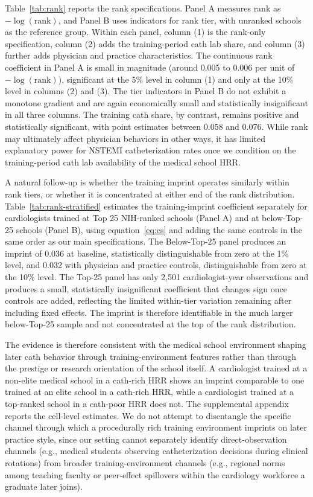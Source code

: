 \documentclass[12pt]{article}
\begin{document}
Table~\ref{tab:rank} reports the rank specifications. Panel A measures rank as $-\log(\text{rank})$, and Panel B uses indicators for rank tier, with unranked schools as the reference group. Within each panel, column (1) is the rank-only specification, column (2) adds the training-period cath lab share, and column (3) further adds physician and practice characteristics. The continuous rank coefficient in Panel A is small in magnitude (around 0.005 to 0.006 per unit of $-\log(\text{rank})$), significant at the 5\% level in column (1) and only at the 10\% level in columns (2) and (3). The tier indicators in Panel B do not exhibit a monotone gradient and are again economically small and statistically insignificant in all three columns. The training cath share, by contrast, remains positive and statistically significant, with point estimates between 0.058 and 0.076. While rank may ultimately affect physician behaviors in other ways, it has limited explanatory power for NSTEMI catheterization rates once we condition on the training-period cath lab availability of the medical school HRR.

A natural follow-up is whether the training imprint operates similarly within rank tiers, or whether it is concentrated at either end of the rank distribution. Table~\ref{tab:rank-stratified} estimates the training-imprint coefficient separately for cardiologists trained at Top 25 NIH-ranked schools (Panel A) and at below-Top-25 schools (Panel B), using equation~\eqref{eq:cs} and adding the same controls in the same order as our main specifications. The Below-Top-25 panel produces an imprint of 0.036 at baseline, statistically distinguishable from zero at the 1\% level, and 0.032 with physician and practice controls, distinguishable from zero at the 10\% level. The Top-25 panel has only 2,501 cardiologist-year observations and produces a small, statistically insignificant coefficient that changes sign once controls are added, reflecting the limited within-tier variation remaining after including fixed effects. The imprint is therefore identifiable in the much larger below-Top-25 sample and not concentrated at the top of the rank distribution.

The evidence is therefore consistent with the medical school environment shaping later cath behavior through training-environment features rather than through the prestige or research orientation of the school itself. A cardiologist trained at a non-elite medical school in a cath-rich HRR shows an imprint comparable to one trained at an elite school in a cath-rich HRR, while a cardiologist trained at a top-ranked school in a cath-poor HRR does not. The supplemental appendix reports the cell-level estimates. We do not attempt to disentangle the specific channel through which a procedurally rich training environment imprints on later practice style, since our setting cannot separately identify direct-observation channels (e.g., medical students observing catheterization decisions during clinical rotations) from broader training-environment channels (e.g., regional norms among teaching faculty or peer-effect spillovers within the cardiology workforce a graduate later joins).
\end{document}
